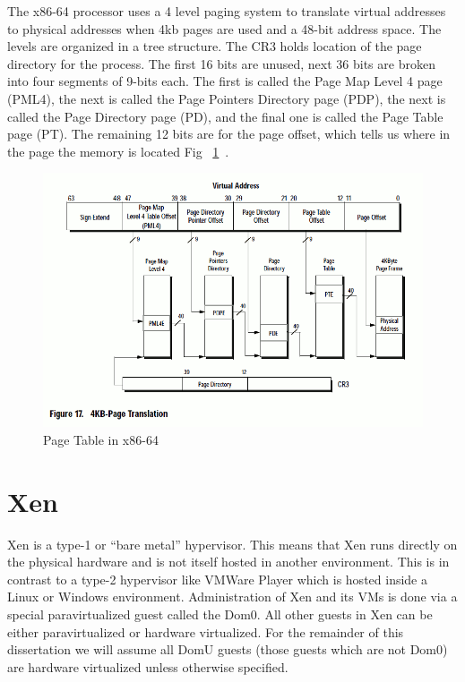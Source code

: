 The x86-64 processor uses a 4 level paging system to translate virtual addresses to physical addresses when 4kb pages are used and a 48-bit address space. The levels are organized in a tree structure. The CR3 holds location of the page directory for the process. The first 16 bits are unused, next 36 bits are broken into four segments of 9-bits each. The first is called the Page Map Level 4 page (PML4), the next is called the Page Pointers Directory page (PDP), the next is called the Page Directory page (PD), and the final one is called the Page Table page (PT). The remaining 12 bits are for the page offset, which tells us where in the page the memory is located Fig ~\ref{VirtPaging}~\cite{_file:x86_2009}. 

\begin{figure}\label{VirtPaging}
	  \centering
	  \includegraphics[width=\textwidth]{figures/Orion64BitTranslation.png}
	  \caption{Page Table in x86-64 ~\cite{OrionPaging} }
\end{figure}



\section{Xen}
Xen is a type-1 or ``bare metal'' hypervisor. This means that Xen runs directly on the physical hardware and is not itself hosted in another environment. This is in contrast to a type-2 hypervisor like VMWare Player which is hosted inside a Linux or Windows environment. Administration of Xen and its VMs is done via a special paravirtualized guest called the Dom0. All other guests in Xen can be either paravirtualized or hardware virtualized. For the remainder of this dissertation we will assume all DomU guests (those guests which are not Dom0) are hardware virtualized unless otherwise specified.

